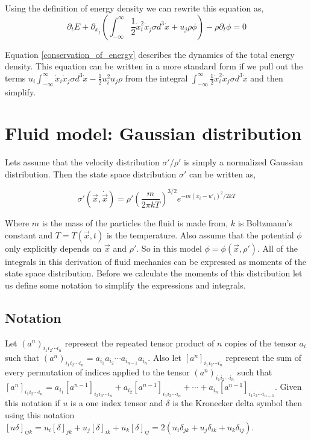 \documentclass[%
 twocolumn,
 amsmath,amssymb,
 aps,
]{revtex4-1}
\newcommand{\dvec}[1]{\dot{\vec{#1}}}
\newcommand{\intVdot}[1]{\int_{-\infty}^{\infty} #1 d^3\dot{x}}
\begin{document}
Using the definition of energy density we can rewrite this equation as, 
\begin{equation}
\partial_t E + \partial_{x_j}\left(\intVdot{\frac{1}{2}\dot{x}_i^2\dot{x}_j\sigma} + u_j\rho\phi\right) - \rho\partial_t\phi=0
\label{conservation_of_energy}
\end{equation}

Equation \eqref{conservation_of_energy} describes the dynamics of the total energy density. This equation can be written in a more standard form if we pull out the terms $u_i\intVdot{\dot{x}_i\dot{x}_j\sigma} - \frac{1}{2}u_i^2u_j\rho$ from the integral $\intVdot{\frac{1}{2}\dot{x}_i^2\dot{x}_j\sigma}$ and then simplify.

\section{Fluid model: Gaussian distribution}
Lets assume that the velocity distribution $\sigma'/\rho'$ is simply a normalized Gaussian distribution. Then the state space distribution $\sigma'$ can be written as,

\begin{equation}
\sigma'(\vec{x}, \dvec{x}) = \rho'\left(\frac{m}{2\pi kT}\right)^{3/2}e^{-m\left(x_i - u'_i\right)^2/2kT}
\label{gaussian_state_space}
\end{equation}

Where $m$ is the mass of the particles the fluid is made from, $k$ is Boltzmann's constant and $T=T(\vec{x}, t)$ is the temperature. Also assume that the potential $\phi$ only explicitly depends on $\vec{x}$ and $\rho'$. So in this model $\phi=\phi(\vec{x}, \rho')$. All of the integrals in this derivation of fluid mechanics can be expressed as moments of the state space distribution. Before we calculate the moments of this distribution let us define some notation to simplify the expressions and integrals.

\subsection{Notation}
Let $\left(a^n\right)_{i_1i_2\cdots i_n}$ represent the repeated tensor product of $n$ copies of the tensor $a_i$ such that $\left(a^n\right)_{i_1i_2\cdots i_n}=a_{i_1}a_{i_2}\cdots a_{i_{n-1}}a_{i_n}$. Also let $\left[a^n\right]_{i_1i_2\cdots i_n}$ represent the sum of every permutation of indices applied to the tensor $\left(a^n\right)_{i_1i_2\cdots i_n}$ such that $\left[a^n\right]_{i_1i_2\cdots i_n}=a_{i_1}\left[a^{n-1}\right]_{i_2i_3\cdots i_n} + a_{i_2}\left[a^{n-1}\right]_{i_1i_3\cdots i_n} + \cdots + a_{i_n}\left[a^{n-1}\right]_{i_1i_2\cdots i_{n-1}}$. Given this notation if $u$ is a one index tensor and $\delta$ is the Kronecker delta symbol then using this notation $\left[u\delta\right]_{ijk}=u_i\left[\delta\right]_{jk} + u_j\left[\delta\right]_{ik} + u_k\left[\delta\right]_{ij}=2\left(u_i\delta_{jk} + u_j\delta_{ik} + u_k\delta_{ij}\right)$.
\end{document}
